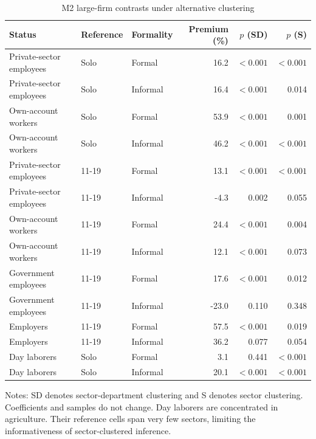 \begin{table}[htbp]
\centering\small
\caption{M2 large-firm contrasts under alternative clustering}
\label{tab:status-clustering}
\begin{tabular}{l ll rrr}
\toprule
Status & Reference & Formality & Premium (\%) & $p$ (SD) & $p$ (S) \\
\midrule
Private-sector employees & Solo & Formal & 16.2 & $<0.001$ & $<0.001$ \\
Private-sector employees & Solo & Informal & 16.4 & $<0.001$ & 0.014 \\
Own-account workers & Solo & Formal & 53.9 & $<0.001$ & 0.001 \\
Own-account workers & Solo & Informal & 46.2 & $<0.001$ & $<0.001$ \\
Private-sector employees & 11-19 & Formal & 13.1 & $<0.001$ & $<0.001$ \\
Private-sector employees & 11-19 & Informal & -4.3 & 0.002 & 0.055 \\
Own-account workers & 11-19 & Formal & 24.4 & $<0.001$ & 0.004 \\
Own-account workers & 11-19 & Informal & 12.1 & $<0.001$ & 0.073 \\
Government employees & 11-19 & Formal & 17.6 & $<0.001$ & 0.012 \\
Government employees & 11-19 & Informal & -23.0 & 0.110 & 0.348 \\
Employers & 11-19 & Formal & 57.5 & $<0.001$ & 0.019 \\
Employers & 11-19 & Informal & 36.2 & 0.077 & 0.054 \\
Day laborers & Solo & Formal & 3.1 & 0.441 & $<0.001$ \\
Day laborers & Solo & Informal & 20.1 & $<0.001$ & $<0.001$ \\
\bottomrule
\end{tabular}
\par\vspace{0.3em}
\begin{minipage}{0.97\textwidth}\footnotesize
Notes: SD denotes sector-department clustering and S denotes sector clustering. Coefficients and samples do not change. Day laborers are concentrated in agriculture. Their reference cells span very few sectors, limiting the informativeness of sector-clustered inference.
\end{minipage}
\end{table}
